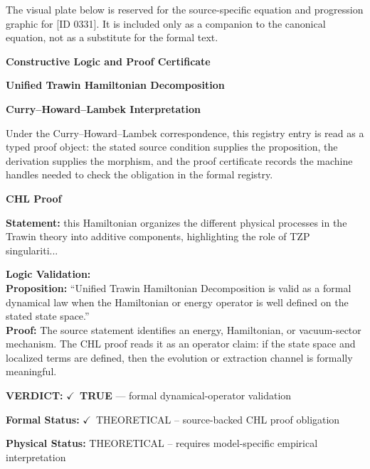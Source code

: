 \begingroup\footnotesize\sloppy
The visual plate below is reserved for the source-specific equation and progression graphic for [ID 0331]. It is included only as a companion to the canonical equation, not as a substitute for the formal text.
\par\endgroup
\ifTZPDarkEdition
{}
\fi

\clearpage
\begingroup\tzpsupportsetup
\noindent\textbf{\fontsize{10.8pt}{12.8pt}\selectfont [ID 0331] Constructive Logic and Proof Certificate}\par
\noindent\textbf{\fontsize{10pt}{12pt}\selectfont Unified Trawin Hamiltonian Decomposition}\par
\vspace{0.45em}
\begingroup
\footnotesize
\setlength{\parskip}{0.22em}
\setlength{\parindent}{0pt}
\noindent\textbf{Curry--Howard--Lambek Interpretation}\par
Under the Curry--Howard--Lambek correspondence, this registry entry is read as a typed proof
object: the stated source condition supplies the proposition, the derivation supplies the
morphism, and the proof certificate records the machine handles needed to check the obligation
in the formal registry.

\vspace{0.45em}
\noindent\textbf{CHL Proof}\par
\textbf{Statement:} this Hamiltonian organizes the different physical processes in the Trawin theory into
additive components, highlighting the role of TZP singulariti...

\textbf{Logic Validation:}\\
\textbf{Proposition:} ``Unified Trawin Hamiltonian Decomposition is valid as a formal dynamical law when the
Hamiltonian or energy operator is well defined on the stated state space.''\\
\textbf{Proof:} The source statement identifies an energy, Hamiltonian, or vacuum-sector mechanism. The
CHL proof reads it as an operator claim: if the state space and localized terms are
defined, then the evolution or extraction channel is formally meaningful.

\textbf{VERDICT:} \ensuremath{\checkmark}\ \textbf{TRUE} --- formal dynamical-operator validation

\textbf{Formal Status:} \ensuremath{\checkmark}\ THEORETICAL -- source-backed CHL proof obligation

\textbf{Physical Status:} THEORETICAL -- requires model-specific empirical interpretation
\par\vspace{0.45em}
\par
\ifTZPDarkEdition
{}
\fi
\endgroup
\endgroup
